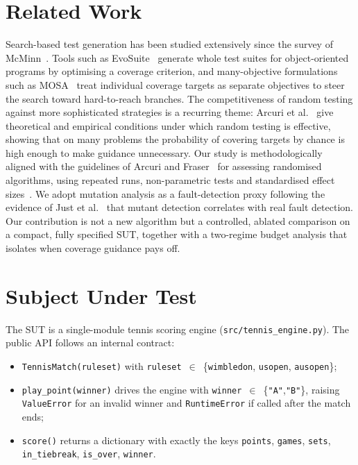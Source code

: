 \documentclass[conference]{IEEEtran}
\begin{document}
\section{Related Work}
Search-based test generation has been studied extensively since the survey of
McMinn~\cite{mcminn2004search}. Tools such as EvoSuite~\cite{fraser2011evosuite}
generate whole test suites for object-oriented programs by optimising a coverage
criterion, and many-objective formulations such as
MOSA~\cite{panichella2018mosa} treat individual coverage targets as separate
objectives to steer the search toward hard-to-reach branches. The
competitiveness of random testing against more sophisticated strategies is a
recurring theme: Arcuri et al.~\cite{arcuri2012random} give theoretical and
empirical conditions under which random testing is effective, showing that on
many problems the probability of covering targets by chance is high enough to
make guidance unnecessary. Our study is methodologically aligned with the
guidelines of Arcuri and Fraser~\cite{arcuri2014hitchhiker} for assessing
randomised algorithms, using repeated runs, non-parametric tests and
standardised effect sizes~\cite{vargha2000critique}. We adopt mutation analysis
as a fault-detection proxy following the evidence of
Just et al.~\cite{just2014mutants} that mutant detection correlates with real
fault detection. Our contribution is not a new algorithm but a controlled,
ablated comparison on a compact, fully specified SUT, together with a two-regime
budget analysis that isolates when coverage guidance pays off.

\section{Subject Under Test}
The SUT is a single-module tennis scoring engine
(\texttt{src/tennis\_engine.py}). The public API follows an internal contract:

\begin{itemize}
\item \texttt{TennisMatch(ruleset)} with
\texttt{ruleset}~$\in$~\{\texttt{wimbledon}, \texttt{usopen},
\texttt{ausopen}\};
\item \texttt{play\_point(winner)} drives the engine with
\texttt{winner}~$\in$~\{\texttt{"A"},\texttt{"B"}\}, raising
\texttt{ValueError} for an invalid winner and \texttt{RuntimeError} if called
after the match ends;
\item \texttt{score()} returns a dictionary with exactly the keys
\texttt{points}, \texttt{games}, \texttt{sets}, \texttt{in\_tiebreak},
\texttt{is\_over}, \texttt{winner}.
\end{itemize}
\end{document}
